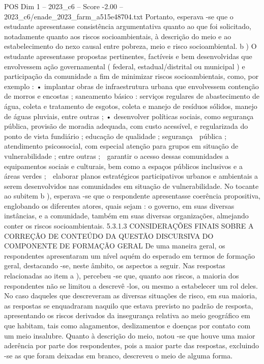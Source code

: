 \begin{textsample}{POS Dim 1 – 2023\_c6 – Score -2.00 – 2023\_c6/enade\_2023\_farm\_a515e48704.txt}
Portanto, esperava -se que o estudante apresentasse consistência argumentativa quanto ao que foi solicitado, notadamente quanto aos riscos socioambientais, à descrição do meio e ao estabelecimento do nexo causal entre pobreza, meio e risco socioambiental. b ) O estudante apresentasse propostas pertinentes, factíveis e bem desenvolvidas que envolvessem ação governamental ( federal, estadual/distrital ou municipal ) e participação da comunidade a fim de minimizar riscos socioambientais, como, por exemplo : • implantar obras de infraestrutura urbana que envolvessem contenção de morros e encostas ; saneamento básico : serviços regulares de abastecimento de água, coleta e tratamento de esgotos, coleta e manejo de resíduos sólidos, manejo de águas pluviais, entre outras ; • desenvolver políticas sociais, como segurança pública, provisão de moradia adequada, com custo acessível, e regularizada do ponto de vista fundiário ; educação de qualidade ; segurança  pública ; atendimento psicossocial, com especial atenção para grupos em situação de vulnerabilidade ; entre outras ;  garantir o acesso dessas comunidades a equipamentos sociais e culturais, bem como a espaços públicos inclusivos e a áreas verdes ;  elaborar planos estratégicos participativos urbanos e ambientais a serem desenvolvidos nas comunidades em situação de vulnerabilidade.
No tocante ao subitem b ), esperava -se que o respondente apresentasse coerência propositiva, englobando os diferentes atores, quais sejam : o governo, em suas diversas instâncias, e a comunidade, também em suas diversas organizações, almejando conter os riscos socioambientais. 5.3.1.3 CONSIDERAÇÕES FINAIS SOBRE A CORREÇÃO DE CONTEÚDO DA QUESTÃO DISCURSIVA DO COMPONENTE DE FORMAÇÃO GERAL De uma maneira geral, os respondentes apresentaram um nível aquém do esperado em termos de formação geral, destacando -se, neste âmbito, os aspectos a seguir.
Nas respostas relacionadas ao item a ), percebeu -se que, quanto aos riscos, a maioria dos respondentes não se limitou a descrevê -los, ou mesmo a estabelecer um rol deles.
No caso daqueles que descreveram as diversas situações de risco, em sua maioria, as respostas se enquadraram naquilo que estava previsto no padrão de resposta, apresentando os riscos derivados da insegurança relativa ao meio geográfico em que habitam, tais como alagamentos, deslizamentos e doenças por contato com um meio insalubre.
Quanto à descrição do meio, notou -se que houve uma maior aderência por parte dos respondentes, pois a maior parte das respostas, excluindo -se as que foram deixadas em branco, descreveu o meio de alguma forma.

\end{textsample}
